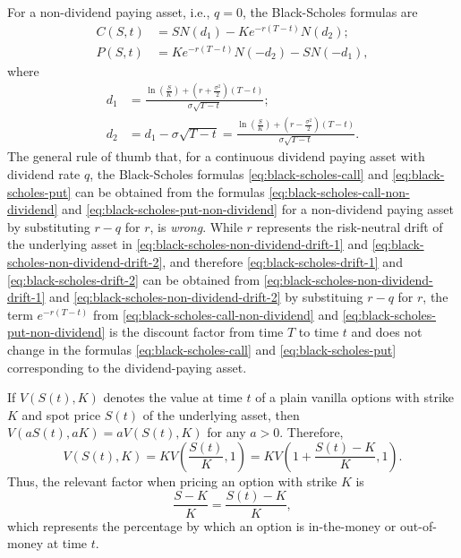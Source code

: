 For a non-dividend paying asset, i.e., $ q = 0 $, the Black-Scholes formulas are
\begin{align}
    C(S, t) &= S N(d_1) - Ke^{-r (T - t)} N(d_2);
    \label{eq:black-scholes-call-non-dividend} \\
    P(S, t) &= K e^{-r (T - t)} N(-d_2) - S N(-d_1),
    \label{eq:black-scholes-put-non-dividend}
\end{align}
where
\begin{align}
    d_1 &= \frac{\ln \left( \frac{S}{K} \right) + \left( r +
        \frac{\sigma^2}{2} \right) (T - t)}{\sigma \sqrt{T - t}};
    \label{eq:black-scholes-non-dividend-drift-1} \\
    d_2 &= d_1 - \sigma \sqrt{T - t} = \frac{\ln \left( \frac{S}{K} \right) +
        \left( r - \frac{\sigma^2}{2} \right) (T - t)}{\sigma \sqrt{T - t}}.
    \label{eq:black-scholes-non-dividend-drift-2}
\end{align}
The general rule of thumb that, for a continuous dividend paying asset with
    dividend rate $ q $, the Black-Scholes formulas
    \eqref{eq:black-scholes-call} and \eqref{eq:black-scholes-put} can be
    obtained from the formulas \eqref{eq:black-scholes-call-non-dividend} and
    \eqref{eq:black-scholes-put-non-dividend} for a non-dividend paying asset
    by substituting $ r - q $ for $ r $, is \textit{wrong}.
While $ r $ represents the risk-neutral drift of the underlying asset in
    \eqref{eq:black-scholes-non-dividend-drift-1} and
    \eqref{eq:black-scholes-non-dividend-drift-2}, and therefore
    \eqref{eq:black-scholes-drift-1} and \eqref{eq:black-scholes-drift-2} can be
    obtained from \eqref{eq:black-scholes-non-dividend-drift-1} and
    \eqref{eq:black-scholes-non-dividend-drift-2} by substituing $ r - q $ for
    $ r $, the term $ e^{-r (T - t)} $ from
    \eqref{eq:black-scholes-call-non-dividend} and
    \eqref{eq:black-scholes-put-non-dividend} is the discount factor from time
    $ T $ to time $ t $ and does not change in the formulas
    \eqref{eq:black-scholes-call} and \eqref{eq:black-scholes-put} corresponding
    to the dividend-paying asset.

If $ V(S(t), K) $ denotes the value at time $ t $ of a plain vanilla options
    with strike $ K $ and spot price $ S(t) $ of the underlying asset, then
    $ V(a S(t), a K) = a V(S(t), K) $ for any $ a > 0 $.
Therefore,
\begin{equation*}
    V(S(t), K) = K V \left( \frac{S(t)}{K}, 1 \right) = K V \left( 1 +
        \frac{S(t) - K}{K}, 1 \right).
\end{equation*}
Thus, the relevant factor when pricing an option with strike $ K $ is
\begin{equation*}
    \frac{S - K}{K} = \frac{S(t) - K}{K},
\end{equation*}
which represents the percentage by which an option is in-the-money or
    out-of-money at time $ t $.
